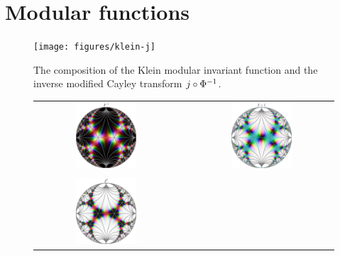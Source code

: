 \section{Modular functions}



\begin{figure}
\centering
\texttt{[image: figures/klein-j]}
\caption{The composition of the Klein modular invariant function and the inverse modified Cayley transform $j \circ {\Phi}^{-1}$.}
\label{fig_KleinJ}
\end{figure}

\begin{figure}
\centering
\begin{tabular}{c c c}
\includegraphics[width=0.45\textwidth]{figures/klein-jinv} & \quad &
\includegraphics[width=0.45\textwidth]{figures/klein-jm1} \\
\\
\includegraphics[width=0.45\textwidth]{figures/klein-jsqr} & \quad &

\end{tabular}
\end{figure}
